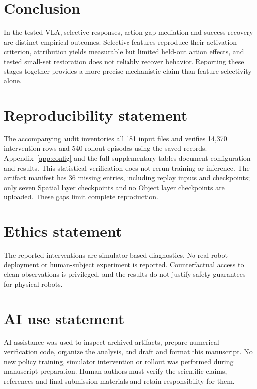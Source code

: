 \documentclass{article}
\begin{document}
\section{Conclusion}
In the tested VLA, selective responses, action-gap mediation and success recovery are distinct empirical outcomes. Selective features reproduce their activation criterion, attribution yields measurable but limited held-out action effects, and tested small-set restoration does not reliably recover behavior. Reporting these stages together provides a more precise mechanistic claim than feature selectivity alone.

\section*{Reproducibility statement}
The accompanying audit inventories all 181 input files and verifies 14,370 intervention rows and 540 rollout episodes using the saved records. Appendix~\ref{app:config} and the full supplementary tables document configuration and results. This statistical verification does not rerun training or inference. The artifact manifest has 36 missing entries, including replay inputs and checkpoints; only seven Spatial layer checkpoints and no Object layer checkpoints are uploaded. These gaps limit complete reproduction.

\section*{Ethics statement}
The reported interventions are simulator-based diagnostics. No real-robot deployment or human-subject experiment is reported. Counterfactual access to clean observations is privileged, and the results do not justify safety guarantees for physical robots.

\section*{AI use statement}
AI assistance was used to inspect archived artifacts, prepare numerical verification code, organize the analysis, and draft and format this manuscript. No new policy training, simulator intervention or rollout was performed during manuscript preparation. Human authors must verify the scientific claims, references and final submission materials and retain responsibility for them.



\appendix
\end{document}
